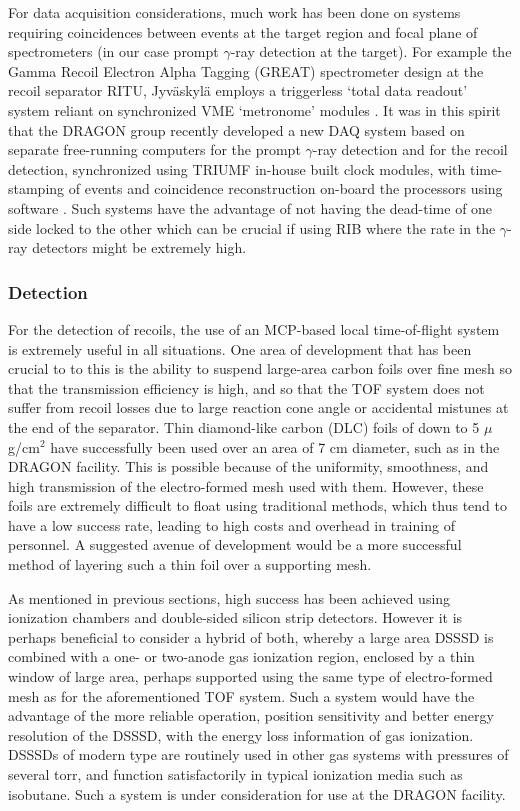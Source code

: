 For data acquisition considerations, much work has been done on systems requiring coincidences between events at the target region and focal plane of spectrometers (in our case prompt $\gamma$-ray detection at the target). For example the Gamma Recoil Electron Alpha Tagging (GREAT) spectrometer design at the recoil separator RITU, Jyv\"{a}skyl\"{a} \cite{pag03} employs a triggerless `total data readout' system reliant on synchronized VME `metronome' modules \cite{laz01}. It was in this spirit that the DRAGON group recently developed a new DAQ system based on separate free-running computers for the prompt $\gamma$-ray detection and for the recoil detection, synchronized using TRIUMF in-house built clock modules, with time-stamping of events and coincidence reconstruction on-board the processors using software \cite{chr14b}. Such systems have the advantage of not having the dead-time of one side locked to the other which can be crucial if using RIB where the rate in the $\gamma$-ray detectors might be extremely high. 

\subsubsection{Detection}

For the detection of recoils, the use of an MCP-based local time-of-flight system is extremely useful in all situations. One area of development that has been crucial to to this is the ability to suspend large-area carbon foils over fine mesh so that the transmission efficiency is high, and so that the TOF system does not suffer from recoil losses due to large reaction cone angle or accidental mistunes at the end of the separator. Thin diamond-like carbon (DLC) foils of down to 5 $\mu$g/cm$^2$ have successfully been used over an area of 7 cm diameter, such as in the DRAGON facility. This is possible because of the uniformity,  smoothness, and high transmission of the electro-formed mesh used with them. However, these foils are extremely difficult to float using traditional methods, which thus tend to have a low success rate, leading to high costs and overhead in training of personnel. A suggested avenue of development would be a more successful method of layering such a thin foil over a supporting mesh. 

As mentioned in previous sections, high success has been achieved using ionization chambers and double-sided silicon strip detectors. However it is perhaps beneficial to consider a hybrid of both, whereby a large area DSSSD is combined with a one- or two-anode gas ionization region, enclosed by a thin window of large area, perhaps supported using the same type of electro-formed mesh as for the aforementioned TOF system.  Such a system would have the advantage of the more reliable operation, position sensitivity and better energy resolution of the DSSSD, with the energy loss information of gas ionization. DSSSDs of modern type are routinely used in other gas systems with pressures of several torr, and function satisfactorily in typical ionization media such as isobutane. Such a system is under consideration for use at the DRAGON facility. 

